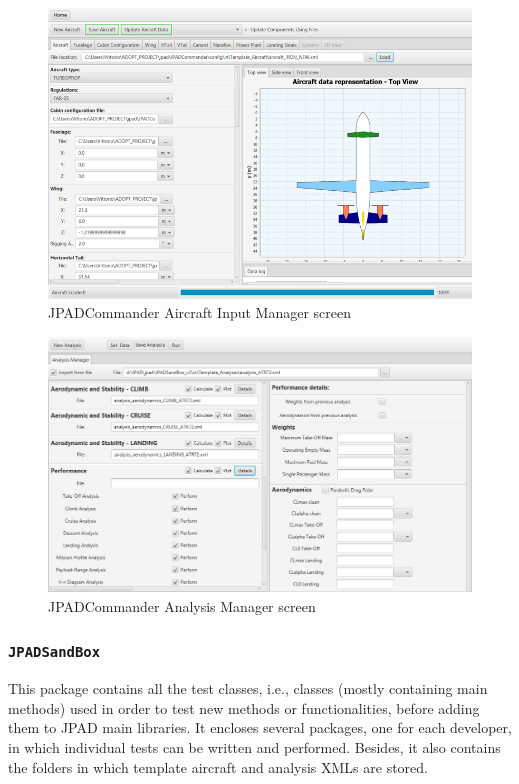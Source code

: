\begin{figure}[H]
\centering
\includegraphics[scale=2.0]{Immagini/Capitolo1/AircraftInputManager}
\caption{JPADCommander Aircraft Input Manager screen}
\label{fig:GUIInputManager}
\end{figure}
%
\begin{figure}[H]
\centering
\includegraphics[scale=1.5]{Immagini/Capitolo1/AnalysisManagerGUI}
\caption{JPADCommander Analysis Manager screen}
\label{fig:GUIAnalysisManager}
\end{figure}
%

\subsubsection{\texttt{JPADSandBox}}
This package contains all the test classes, i.e., classes (mostly containing main methods) used in order to test new methods or functionalities, before adding them to \gls{JPAD} main libraries. It encloses several packages, one for each developer, in which individual tests can be written and performed. Besides, it also contains the folders in which template aircraft and analysis XMLs are stored.

